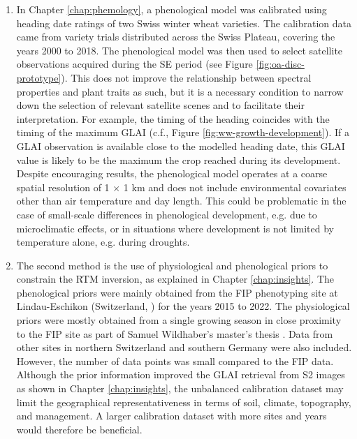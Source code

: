 \begin{enumerate}

\item In Chapter \ref{chap:phemology}, a phenological model was calibrated using heading date ratings of two Swiss winter wheat varieties. The calibration data came from variety trials distributed across the Swiss Plateau, covering the years 2000 to 2018. The phenological model was then used to select satellite observations acquired during the \gls{SE} period (see Figure \ref{fig:oa-disc-prototype}). This does not improve the relationship between spectral properties and plant traits as such, but it is a necessary condition to narrow down the selection of relevant satellite scenes and to facilitate their interpretation. For example, the timing of the heading coincides with the timing of the maximum \gls{GLAI} (c.f., Figure \ref{fig:ww-growth-development}). If a \gls{GLAI} observation is available close to the modelled heading date, this \gls{GLAI} value is likely to be the maximum the crop reached during its development. Despite encouraging results, the phenological model operates at a coarse spatial resolution of 1 $\times$ 1 km and does not include environmental covariates other than air temperature and day length. This could be problematic in the case of small-scale differences in phenological development, e.g. due to microclimatic effects, or in situations where development is not limited by temperature alone, e.g. during droughts.

\item The second method is the use of physiological and phenological priors to constrain the \gls{RTM} inversion, as explained in Chapter \ref{chap:insights}. The phenological priors were mainly obtained from the FIP phenotyping site at Lindau-Eschikon (Switzerland, \cite{kirchgessner_eth_2017}) for the years 2015 to 2022. The physiological priors were mostly obtained from a single growing season in close proximity to the FIP site as part of Samuel Wildhaber's master's thesis \citep{wildhaber_assessing_2023}. Data from other sites in northern Switzerland and southern Germany were also included. However, the number of data points was small compared to the FIP data. Although the prior information improved the \gls{GLAI} retrieval from \gls{S2} images as shown in Chapter \ref{chap:insights}, the unbalanced calibration dataset may limit the geographical representativeness in terms of soil, climate, topography, and management. A larger calibration dataset with more sites and years would therefore be beneficial.


\end{enumerate}
